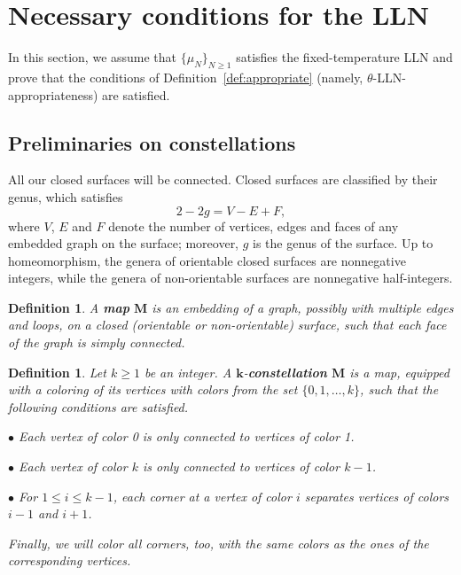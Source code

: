 \documentclass[11pt]{article}
\theoremstyle{plain}
\newtheorem{definition}[lemma]{Definition}
\newcommand{\MM}{\mathbf M}
\begin{document}
\section{Necessary conditions for the LLN}\label{sec:necessary}


In this section, we assume that $\{\mu_N\}_{N\ge 1}$ satisfies the fixed-temperature LLN and prove that the conditions of Definition~\ref{def:appropriate} (namely, $\theta$-LLN-appropriateness) are satisfied.


\subsection{Preliminaries on constellations}


All our closed surfaces will be connected.
Closed surfaces are classified by their genus, which satisfies
\[
2-2g = V-E+F,
\]
where $V$, $E$ and $F$ denote the number of vertices, edges and faces of any embedded graph on the surface; moreover, $g$ is the genus of the surface.
Up to homeomorphism, the genera of orientable closed surfaces are nonnegative integers, while the genera of non-orientable surfaces are nonnegative half-integers.


\begin{definition}\label{def:map}
    A  \textbf{map} $\MM$ is an embedding of a graph, possibly with multiple edges and loops, on a closed (orientable or non-orientable) surface, such that each face of the graph is simply connected. 
\end{definition}


\begin{definition}\label{def:const}
Let $k\ge 1$ be an integer. A $\mathbf{k}$-\textbf{constellation} $\MM$ is a map, equipped with a coloring of its vertices with colors from the set $\{0, 1,\dots, k\}$, such that the following conditions are satisfied.

\smallskip

    $\bullet$ Each vertex of color 0 is only connected to vertices of color 1.

\smallskip

    $\bullet$ Each vertex of color $k$ is only connected to vertices of color $k-1$.

\smallskip

    $\bullet$ For $1\le i\le k-1$, each corner at a vertex of color $i$ separates vertices of colors $i-1$ and $i+1$.

\smallskip

\noindent Finally, we will color all corners, too, with the same colors as the ones of the corresponding vertices.
\end{definition}
\end{document}
